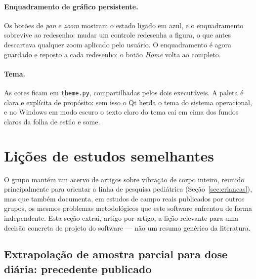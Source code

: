 \documentclass[11pt,a4paper]{article}
\newcommand{\code}[1]{\texttt{\small #1}}
\begin{document}
\paragraph{Enquadramento de gráfico persistente.} Os botões de \emph{pan} e
\emph{zoom} mostram o estado ligado em azul, e o enquadramento sobrevive ao
redesenho: mudar um controle redesenha a figura, o que antes descartava
qualquer zoom aplicado pelo usuário. O enquadramento é agora guardado e
reposto a cada redesenho; o botão \emph{Home} volta ao completo.

\paragraph{Tema.} As cores ficam em \code{theme.py}, compartilhadas pelos dois
executáveis. A paleta é clara e explícita de propósito: sem isso o Qt herda o
tema do sistema operacional, e no Windows em modo escuro o texto claro do tema
cai em cima dos fundos claros da folha de estilo e some.

\section{Lições de estudos semelhantes}
\label{sec:licoes}

O grupo mantém um acervo de artigos sobre vibração de corpo inteiro, reunido
principalmente para orientar a linha de pesquisa pediátrica
(Seção~\ref{sec:criancas}), mas que também documenta, em estudos de campo
reais publicados por outros grupos, os mesmos problemas metodológicos que este
software enfrentou de forma independente. Esta seção extrai, artigo por
artigo, a lição relevante para uma decisão concreta de projeto do software ---
não um resumo genérico da literatura.

\subsection{Extrapolação de amostra parcial para dose diária: precedente publicado}
\end{document}
